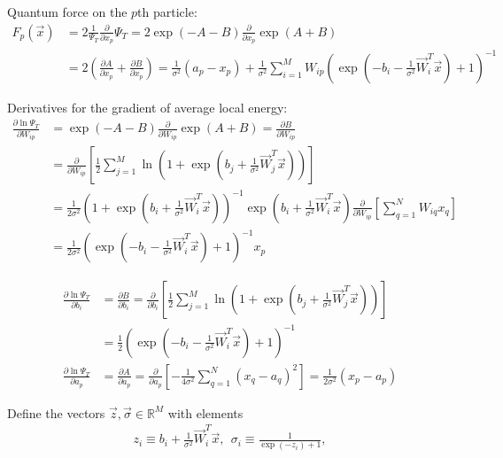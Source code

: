 \documentclass[12pt]{article}
\begin{document}
\noindent Quantum force on the $p$th particle:
\begin{align*}
F_p(\vec{x}) &= 2 \frac{1}{\Psi_T} \frac{\partial}{\partial x_p} \Psi_T = 2 \exp(-A-B) \frac{\partial}{\partial x_p} \exp(A+B) \\
&= 2 \left( \frac{\partial A}{\partial x_p} + \frac{\partial B}{\partial x_p} \right) = \frac{1}{\sigma^2} (a_p-x_p) + \frac{1}{\sigma^2} \sum_{i=1}^M W_{ip} \left( \exp \left(-b_i - \frac{1}{\sigma^2} \vec{W}_i^T \vec{x} \right)+1 \right)^{-1}
\end{align*}

\noindent Derivatives for the gradient of average local energy:
\begin{align*}
\frac{\partial \ln \Psi_T}{\partial W_{ip}} 
&= \exp (-A-B) \frac{\partial}{\partial W_{ip}} \exp(A+B) = \frac{\partial B}{\partial W_{ip}}\\
&= \frac{\partial}{\partial W_{ip}} \left[ \frac{1}{2} \sum_{j=1}^M \ln \left( 1 + \exp \left(b_j + \frac{1}{\sigma^2} \vec{W}_j^T \vec{x} \right) \right) \right]\\
&= \frac{1}{2\sigma^2}\left( 1+ \exp \left( b_i + \frac{1}{\sigma^2} \vec{W}_i^T \vec{x} \right) \right)^{-1} \exp \left( b_i + \frac{1}{\sigma^2} \vec{W}_i^T \vec{x} \right) \frac{\partial}{\partial W_{ip}} \left[ \sum_{q=1}^N W_{iq}x_q \right]\\
&= \frac{1}{2\sigma^2} \left( \exp \left( -b_i -\frac{1}{\sigma^2} \vec{W}_i^T \vec{x} \right) + 1 \right)^{-1} x_p 
\end{align*}

\begin{align*}
\frac{\partial \ln \Psi_T}{\partial b_i} 
&= \frac{\partial B}{\partial b_i}
= \frac{\partial}{\partial b_i} \left[ \frac{1}{2} \sum_{j=1}^M \ln \left( 1 + \exp \left(b_j + \frac{1}{\sigma^2} \vec{W}_j^T \vec{x} \right) \right) \right] \\
&= \frac{1}{2} \left( \exp \left( -b_i -\frac{1}{\sigma^2} \vec{W}_i^T \vec{x} \right) + 1 \right)^{-1}\\
%
\frac{\partial \ln \Psi_T}{\partial a_p} &= \frac{\partial A}{\partial a_p}
=  \frac{\partial}{\partial a_p}\left[ -\frac{1}{4\sigma^2} \sum_{q=1}^N (x_q-a_q)^2 \right] = \frac{1}{2\sigma^2} (x_p-a_p)
\end{align*}

\noindent Define the vectors $\vec{z}, \vec{\sigma} \in \mathbb{R}^M$ with elements
\begin{align*}
z_i \equiv b_i + \frac{1}{\sigma^2} \vec{W}_i^T \vec{x}, \ \ 
\sigma_i \equiv \frac{1}{ \exp (-z_i) + 1 }, 
\end{align*}
\end{document}
